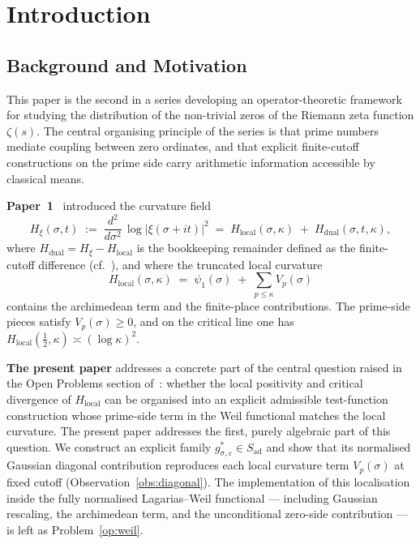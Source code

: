 \documentclass[11pt]{article}
\newcommand{\Hlocal}{H_{\mathrm{local}}}
\newcommand{\Sad}{S_{\mathrm{ad}}}
\begin{document}
\newpage

\section{Introduction}
\label{sec:intro}

\subsection{Background and Motivation}

This paper is the second in a series developing an
operator-theoretic framework for studying the distribution of
the non-trivial zeros of the Riemann zeta function $\zeta(s)$.
The central organising principle of the series is that prime
numbers mediate coupling between zero ordinates, and that
explicit finite-cutoff constructions on the prime side carry
arithmetic information accessible by classical means.

\textbf{Paper~1}~\cite{Paper1} introduced the curvature field
\[
H_\xi(\sigma,t) \;:=\; \frac{d^2}{d\sigma^2}\,
\log|\xi(\sigma+it)|^2
\;=\; \Hlocal(\sigma,\kappa) \;+\; H_{\mathrm{dual}}(\sigma,t,\kappa),
\]
where $H_{\mathrm{dual}}=H_\xi-\Hlocal$ is the bookkeeping
remainder defined as the finite-cutoff
difference (cf.~\cite{Paper1}), and where the truncated
local curvature
\[
\Hlocal(\sigma,\kappa) \;=\; \psi_1(\sigma)
\;+\; \sum_{p\le\kappa} V_p(\sigma)
\]
contains the archimedean term and the finite-place
contributions.
The prime-side pieces satisfy $V_p(\sigma)\ge 0$, and on the
critical line one has $\Hlocal(\tfrac12,\kappa)\asymp
(\log\kappa)^2$.

\textbf{The present paper} addresses a concrete part of the
central question raised in the Open Problems section
of~\cite[\S\,8]{Paper1}: whether the
local positivity and critical divergence of $\Hlocal$ can be
organised into an explicit admissible test-function construction
whose prime-side term in the Weil functional matches the local
curvature.
The present paper addresses the first, purely algebraic part
of this question.
We construct an explicit family
$g^*_{\sigma,\varepsilon}\in\Sad$ and show that its
normalised Gaussian diagonal contribution reproduces each local
curvature term $V_p(\sigma)$ at fixed cutoff
(Observation~\ref{obs:diagonal}).
The implementation of this localisation inside the fully
normalised Lagarias--Weil functional --- including Gaussian
rescaling, the archimedean term, and the unconditional
zero-side contribution --- is left as
Problem~\ref{op:weil}.
\end{document}
